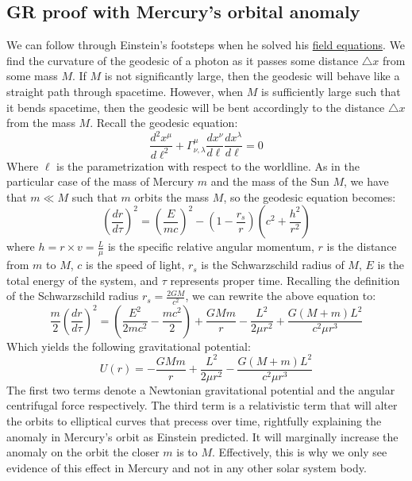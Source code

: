 \documentclass{article}
\begin{document}
	\subsection{GR proof with Mercury's orbital anomaly}
		We can follow through Einstein's footsteps when he solved his \href{https://en.wikisource.org/wiki/The_Foundation_of_the_Generalised_Theory_of_Relativity#C._The_Theory_of_the_Gravitation-Field}{field equations}. We find the curvature of the geodesic of a photon as it passes some distance $\triangle x$ from some mass $M$. If $M$ is not significantly large, then the geodesic will behave like a straight path through spacetime. However, when $M$ is sufficiently large such that it bends spacetime, then the geodesic will be bent accordingly to the distance $\triangle x$ from the mass $M$. Recall the geodesic equation:
		$$ \frac{d^2 x^\mu}{d\ell^2}  + \Gamma_{\nu, \lambda}^{\mu} \frac{d x^\nu}{d\ell}\frac{dx^\lambda}{d\ell} = 0$$
		Where $\ell$ is the parametrization with respect to the worldline. As in the particular case of the mass of Mercury $m$ and the mass of the Sun $M$, we have that $m \ll M$ such that $m$ orbits the mass $M$, so the geodesic equation becomes:
		$$ \left(\frac{dr}{d\tau} \right)^2 = \left(\frac{E}{mc}\right)^2 - \left(1 - \frac{r_s}{r} \right) \left( c^2 + \frac{h^2}{r^2}\right)$$
		where $h = r \times v = \frac{L}{\mu}$ is the specific relative angular momentum, $r$ is the distance from $m$ to $M$, $c$ is the speed of light, $r_s$ is the Schwarzschild radius of $M$, $E$ is the total energy of the system, and $\tau$ represents proper time. Recalling the definition of the Schwarzschild radius $r_s = \frac{2GM}{c^2}$, we can rewrite the above equation to:
		$$ \frac{m}{2} \left(\frac{d r}{d\tau}\right)^2 = \left(\frac{E^2}{2 m c^2} - \frac{mc^2}{2}\right) + \frac{GMm}{r} - \frac{L^2}{2\mu r^2} + \frac{G(M+m)L^2}{c^2 \mu r^3}$$
		Which yields the following gravitational potential:
		$$ U(r) = - \frac{GMm}{r} + \frac{L^2}{2\mu r^2} - \frac{G(M+m)L^2}{c^2 \mu r^3}$$
		The first two terms denote a Newtonian gravitational potential and the angular centrifugal force respectively. The third term is a relativistic term that will alter the orbits to elliptical curves that precess over time, rightfully explaining the anomaly in Mercury's orbit as Einstein predicted. It will marginally increase the anomaly on the orbit the closer $m$ is to $M$. Effectively, this is why we only see evidence of this effect in Mercury and not in any other solar system body.
	\pagebreak
\end{document}
